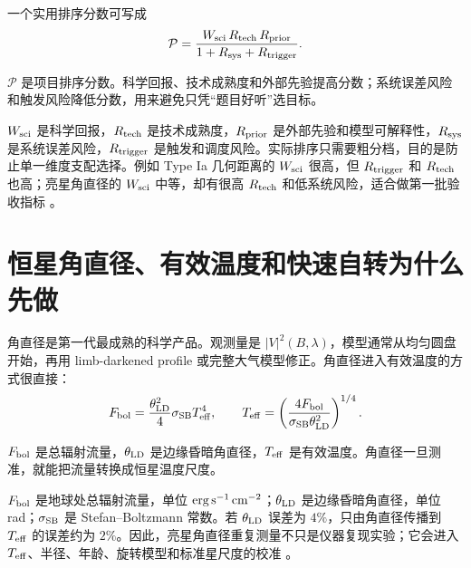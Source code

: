 一个实用排序分数可写成
\begin{equation}
  \mathcal P
  =
  \frac{
  W_{\rm sci}\,
  R_{\rm tech}\,
  R_{\rm prior}
  }{
  1+R_{\rm sys}+R_{\rm trigger}
  } .
  \label{eq:ch19-priority-score}
\end{equation}
\begin{formulaexplain}[公式 (19.1) 解读]
\(\mathcal P\) 是项目排序分数。科学回报、技术成熟度和外部先验提高分数；系统误差风险和触发风险降低分数，用来避免只凭“题目好听”选目标。
\end{formulaexplain}
\(W_{\rm sci}\) 是科学回报，\(R_{\rm tech}\) 是技术成熟度，\(R_{\rm prior}\) 是外部先验和模型可解释性，\(R_{\rm sys}\) 是系统误差风险，\(R_{\rm trigger}\) 是触发和调度风险。实际排序只需要粗分档，目的是防止单一维度支配选择。例如 Type Ia 几何距离的 \(W_{\rm sci}\) 很高，但 \(R_{\rm trigger}\) 和 \(R_{\rm tech}\) 也高；亮星角直径的 \(W_{\rm sci}\) 中等，却有很高 \(R_{\rm tech}\) 和低系统风险，适合做第一批验收指标 \citep{2025PhRvD.111h3047K,2024ApJ...966...28A,2024MNRAS.529.4387A}。

\section{恒星角直径、有效温度和快速自转为什么先做}

角直径是第一代最成熟的科学产品。观测量是 \(|V|^2(B,\lambda)\)，模型通常从均匀圆盘开始，再用 limb-darkened profile 或完整大气模型修正。角直径进入有效温度的方式很直接：
\begin{equation}
  F_{\rm bol}
  =
  \frac{\theta_{\rm LD}^2}{4}
  \sigma_{\rm SB}T_{\rm eff}^4,
  \qquad
  T_{\rm eff}
  =
  \left(
  \frac{4F_{\rm bol}}
  {\sigma_{\rm SB}\theta_{\rm LD}^2}
  \right)^{1/4}.
  \label{eq:ch19-teff}
\end{equation}
\begin{formulaexplain}[公式 (19.2) 解读]
\(F_{\rm bol}\) 是总辐射流量，\(\theta_{\rm LD}\) 是边缘昏暗角直径，\(T_{\rm eff}\) 是有效温度。角直径一旦测准，就能把流量转换成恒星温度尺度。
\end{formulaexplain}
\(F_{\rm bol}\) 是地球处总辐射流量，单位 \({\rm erg\,s^{-1}\,cm^{-2}}\)；\(\theta_{\rm LD}\) 是边缘昏暗角直径，单位 rad；\(\sigma_{\rm SB}\) 是 Stefan--Boltzmann 常数。若 \(\theta_{\rm LD}\) 误差为 \(4\%\)，只由角直径传播到 \(T_{\rm eff}\) 的误差约为 \(2\%\)。因此，亮星角直径重复测量不只是仪器复现实验；它会进入 \(T_{\rm eff}\)、半径、年龄、旋转模型和标准星尺度的校准 \citep{1967MNRAS.137..393H,1974MNRAS.167..121H,1977MNRAS.180..177B,1986Natur.323..234D,2003RPPh...66..789M}。

